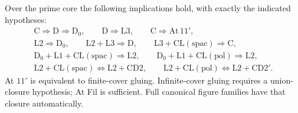 \begin{proposition}
\label{SA21-B-optional-implications}
Over the prime core the following implications hold, with exactly the
indicated hypotheses:
\begin{gather*}
 \mathrm C\Longrightarrow\mathrm D\Longrightarrow\mathrm D_0,
 \qquad \mathrm D\Longrightarrow\mathrm L3,
 \qquad \mathrm C\Longrightarrow\mathrm{At}\,11',\\
 \mathrm L2\Longrightarrow\mathrm D_0,
 \qquad \mathrm L2+\mathrm L3\Longrightarrow\mathrm D,
 \qquad \mathrm L3+\mathrm{CL(spac)}\Longrightarrow\mathrm C,\\
 \mathrm D_0+\mathrm L1+\mathrm{CL(spac)}\Longrightarrow\mathrm L2,
 \qquad \mathrm D_0+\mathrm L1+\mathrm{CL(pol)}\Longrightarrow\mathrm L2,\\
 \mathrm L2+\mathrm{CL(spac)}
 \Longleftrightarrow\mathrm L2+\mathrm{CD2},
 \qquad
 \mathrm L2+\mathrm{CL(pol)}
 \Longleftrightarrow\mathrm L2+\mathrm{CD2}' .
\end{gather*}
At \(11'\) is equivalent to finite-cover gluing. Infinite-cover gluing
requires a union-closure hypothesis; At Fil is sufficient. Full
canonical figure families have that closure automatically.
\end{proposition}

